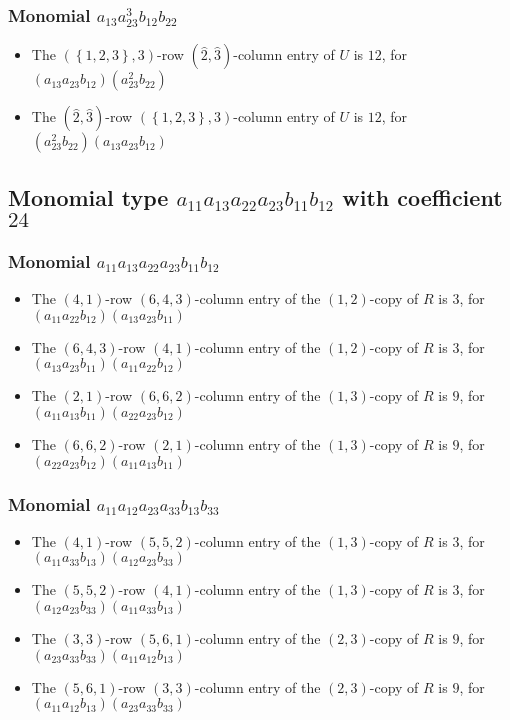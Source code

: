 \documentclass{article}
\begin{document}
\subsubsection{Monomial $ a_{13} a_{23}^{3} b_{12} b_{22} $}

\begin{itemize}
\item The $ \left(\left\{1, 2, 3\right\}, 3\right) $-row $ (\hat{2}, \hat{3}) $-column entry of $U$ is $ 12 $, for $( a_{13} a_{23} b_{12} )( a_{23}^{2} b_{22} )$ 
\item The $(\hat{2}, \hat{3})$-row $ \left(\left\{1, 2, 3\right\}, 3\right) $-column entry of $U$ is $ 12 $, for $( a_{23}^{2} b_{22} )( a_{13} a_{23} b_{12} )$ 
\end{itemize}
\subsection{Monomial type $ a_{11} a_{13} a_{22} a_{23} b_{11} b_{12} $ with coefficient $ 24 $}

\subsubsection{Monomial $ a_{11} a_{13} a_{22} a_{23} b_{11} b_{12} $}

\begin{itemize}
\item The $(4, 1)$-row $(6, 4, 3)$-column entry of the $ \left(1, 2\right) $-copy of $R$ is $ 3 $, for $( a_{11} a_{22} b_{12} )( a_{13} a_{23} b_{11} )$ 
\item The $(6, 4, 3)$-row $(4, 1)$-column entry of the $ \left(1, 2\right) $-copy of $R$ is $ 3 $, for $( a_{13} a_{23} b_{11} )( a_{11} a_{22} b_{12} )$ 
\item The $(2, 1)$-row $(6, 6, 2)$-column entry of the $ \left(1, 3\right) $-copy of $R$ is $ 9 $, for $( a_{11} a_{13} b_{11} )( a_{22} a_{23} b_{12} )$ 
\item The $(6, 6, 2)$-row $(2, 1)$-column entry of the $ \left(1, 3\right) $-copy of $R$ is $ 9 $, for $( a_{22} a_{23} b_{12} )( a_{11} a_{13} b_{11} )$ 
\end{itemize}
\subsubsection{Monomial $ a_{11} a_{12} a_{23} a_{33} b_{13} b_{33} $}

\begin{itemize}
\item The $(4, 1)$-row $(5, 5, 2)$-column entry of the $ \left(1, 3\right) $-copy of $R$ is $ 3 $, for $( a_{11} a_{33} b_{13} )( a_{12} a_{23} b_{33} )$ 
\item The $(5, 5, 2)$-row $(4, 1)$-column entry of the $ \left(1, 3\right) $-copy of $R$ is $ 3 $, for $( a_{12} a_{23} b_{33} )( a_{11} a_{33} b_{13} )$ 
\item The $(3, 3)$-row $(5, 6, 1)$-column entry of the $ \left(2, 3\right) $-copy of $R$ is $ 9 $, for $( a_{23} a_{33} b_{33} )( a_{11} a_{12} b_{13} )$ 
\item The $(5, 6, 1)$-row $(3, 3)$-column entry of the $ \left(2, 3\right) $-copy of $R$ is $ 9 $, for $( a_{11} a_{12} b_{13} )( a_{23} a_{33} b_{33} )$ 
\end{itemize}
\end{document}
